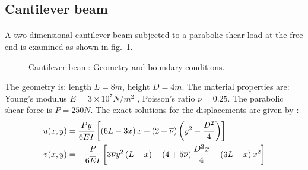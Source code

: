\subsection{Cantilever beam}
\paragraph{}
A two-dimensional cantilever beam subjected to a parabolic shear load at the free end is examined as shown
in fig.~\ref{fig:cantilever_beam_geo_bc}.
    \begin{figure}[h!]
    \centering
        \caption{ Cantilever beam: Geometry and boundary conditions.}
        \label{fig:cantilever_beam_geo_bc}
    \end{figure}

The geometry is: length $L=8m$, height $D=4m$.
The material properties are: Young’s modulus $E$ = $3 \times 10^7 N/m^2$ , Poisson’s ratio $ \nu =0.25$.
The parabolic shear force is $P = 250 N$.
The exact solutions for the displacements are given by \cite{Aug2008}:
    \begin{equation}
        \begin{aligned}
            u(x,y) &= 
                \frac{Py}{6 \overline{E} I}
                \left[
                    \left(
                        6L-3x
                    \right)x
                    +\left(
                        2+ \overline{\nu}
                    \right)\left(
                        y^2-\frac{D^2}{4}
                    \right)
                \right]
            \\
            v(x,y) &=  
                -\frac{P}{6 \overline{E} I}
                \left[
                    3 \overline{\nu} y^2 \left(
                        L-x
                    \right)+
                    \left(
                        4+5 \overline{\nu}
                    \right)\frac{D^2x}{4}+
                    \left(
                        3L-x
                    \right)x^2
                \right]        
        \end{aligned}
    \label{eq:cantilever_beam_displacement_solution}
    \end{equation}


